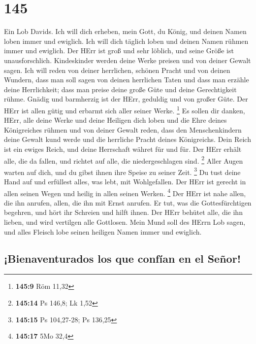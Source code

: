 \hypertarget{section-144}{%
\section{145}\label{section-144}}

 Ein Lob Davids. Ich will dich erheben, mein Gott, du
König, und deinen Namen loben immer und ewiglich.  Ich
will dich täglich loben und deinen Namen rühmen immer und ewiglich.
 Der HErr ist groß und sehr löblich, und seine Größe ist
unausforschlich.  Kindeskinder werden deine Werke preisen
und von deiner Gewalt sagen.  Ich will reden von deiner
herrlichen, schönen Pracht und von deinen Wundern,  dass
man soll sagen von deinen herrlichen Taten und dass man erzähle deine
Herrlichkeit;  dass man preise deine große Güte und deine
Gerechtigkeit rühme.  Gnädig und barmherzig ist der HErr,
geduldig und von großer Güte.  Der HErr ist allen gütig
und erbarmt sich aller seiner Werke. \footnote{\textbf{145:9} Röm 11,32}
 Es sollen dir danken, HErr, alle deine Werke und deine
Heiligen dich loben  und die Ehre deines Königreiches
rühmen und von deiner Gewalt reden,  dass den
Menschenkindern deine Gewalt kund werde und die herrliche Pracht deines
Königreichs.  Dein Reich ist ein ewiges Reich, und deine
Herrschaft währet für und für.  Der HErr erhält alle, die
da fallen, und richtet auf alle, die niedergeschlagen sind. \footnote{\textbf{145:14}
  Ps 146,8; Lk 1,52}  Aller Augen warten auf dich, und du
gibst ihnen ihre Speise zu seiner Zeit. \footnote{\textbf{145:15} Ps
  104,27-28; Ps 136,25}  Du tust deine Hand auf und
erfüllest alles, was lebt, mit Wohlgefallen.  Der HErr
ist gerecht in allen seinen Wegen und heilig in allen seinen Werken.
\footnote{\textbf{145:17} 5Mo 32,4}  Der HErr ist nahe
allen, die ihn anrufen, allen, die ihn mit Ernst anrufen.
 Er tut, was die Gottesfürchtigen begehren, und hört ihr
Schreien und hilft ihnen.  Der HErr behütet alle, die ihn
lieben, und wird vertilgen alle Gottlosen.  Mein Mund
soll des HErrn Lob sagen, und alles Fleisch lobe seinen heiligen Namen
immer und ewiglich.

\hypertarget{bienaventurados-los-que-confuxedan-en-el-seuxf1or}{%
\subsection{¡Bienaventurados los que confían en el
Señor!}\label{bienaventurados-los-que-confuxedan-en-el-seuxf1or}}

